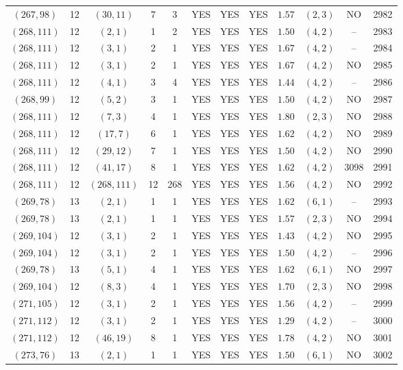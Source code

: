\begin{longtable}{|c|c|c|c|c|c|c|c|c|c|c|c|}
$(267,98)$ & 12 & $(30,11)$ & 7 & 3 & YES & YES & YES & $1.57$ & $(2,3)$ & NO & 2982\\
$(268,111)$ & 12 & $(2,1)$ & 1 & 2 & YES & YES & YES & $1.50$ & $(4,2)$ & -- & 2983\\
$(268,111)$ & 12 & $(3,1)$ & 2 & 1 & YES & YES & YES & $1.67$ & $(4,2)$ & -- & 2984\\
$(268,111)$ & 12 & $(3,1)$ & 2 & 1 & YES & YES & YES & $1.67$ & $(4,2)$ & NO & 2985\\
$(268,111)$ & 12 & $(4,1)$ & 3 & 4 & YES & YES & YES & $1.44$ & $(4,2)$ & -- & 2986\\
$(268,99)$ & 12 & $(5,2)$ & 3 & 1 & YES & YES & YES & $1.50$ & $(4,2)$ & NO & 2987\\
$(268,111)$ & 12 & $(7,3)$ & 4 & 1 & YES & YES & YES & $1.80$ & $(2,3)$ & NO & 2988\\
$(268,111)$ & 12 & $(17,7)$ & 6 & 1 & YES & YES & YES & $1.62$ & $(4,2)$ & NO & 2989\\
$(268,111)$ & 12 & $(29,12)$ & 7 & 1 & YES & YES & YES & $1.50$ & $(4,2)$ & NO & 2990\\
$(268,111)$ & 12 & $(41,17)$ & 8 & 1 & YES & YES & YES & $1.62$ & $(4,2)$ & 3098 & 2991\\
$(268,111)$ & 12 & $(268,111)$ & 12 & 268 & YES & YES & YES & $1.56$ & $(4,2)$ & NO & 2992\\
$(269,78)$ & 13 & $(2,1)$ & 1 & 1 & YES & YES & YES & $1.62$ & $(6,1)$ & -- & 2993\\
$(269,78)$ & 13 & $(2,1)$ & 1 & 1 & YES & YES & YES & $1.57$ & $(2,3)$ & NO & 2994\\
$(269,104)$ & 12 & $(3,1)$ & 2 & 1 & YES & YES & YES & $1.43$ & $(4,2)$ & NO & 2995\\
$(269,104)$ & 12 & $(3,1)$ & 2 & 1 & YES & YES & YES & $1.50$ & $(4,2)$ & -- & 2996\\
$(269,78)$ & 13 & $(5,1)$ & 4 & 1 & YES & YES & YES & $1.62$ & $(6,1)$ & NO & 2997\\
$(269,104)$ & 12 & $(8,3)$ & 4 & 1 & YES & YES & YES & $1.70$ & $(2,3)$ & NO & 2998\\
$(271,105)$ & 12 & $(3,1)$ & 2 & 1 & YES & YES & YES & $1.56$ & $(4,2)$ & -- & 2999\\
$(271,112)$ & 12 & $(3,1)$ & 2 & 1 & YES & YES & YES & $1.29$ & $(4,2)$ & -- & 3000\\
$(271,112)$ & 12 & $(46,19)$ & 8 & 1 & YES & YES & YES & $1.78$ & $(4,2)$ & NO & 3001\\
$(273,76)$ & 13 & $(2,1)$ & 1 & 1 & YES & YES & YES & $1.50$ & $(6,1)$ & NO & 3002\\

\end{longtable}
